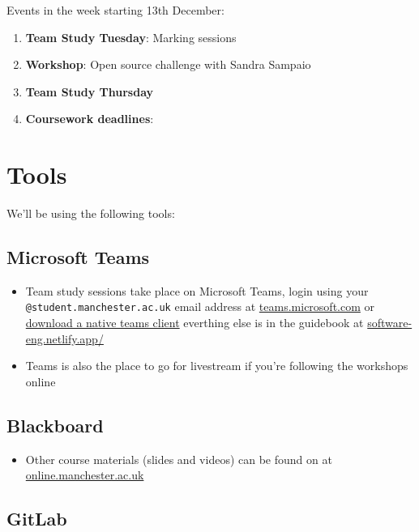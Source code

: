 \documentclass[
]{book}
\providecommand{\tightlist}{%
  \setlength{\itemsep}{0pt}\setlength{\parskip}{0pt}}
\begin{document}
Events in the week starting 13th December:

\begin{enumerate}
\def\labelenumi{\arabic{enumi}.}
\tightlist
\item
  \textbf{Team Study Tuesday}: Marking sessions
\item
  \textbf{Workshop}: Open source challenge with Sandra Sampaio
\item
  \textbf{Team Study Thursday}
\item
  \textbf{Coursework deadlines}:
\end{enumerate}

\hypertarget{tooling}{%
\section{Tools}\label{tooling}}

We'll be using the following tools:

\hypertarget{msfteams}{%
\subsection{Microsoft Teams}\label{msfteams}}

\begin{itemize}
\tightlist
\item
  Team study sessions take place on Microsoft Teams, login using your \texttt{@student.manchester.ac.uk} email address at \href{https://teams.microsoft.com/}{teams.microsoft.com} or \href{https://www.microsoft.com/en-gb/microsoft-teams/download-app}{download a native teams client} everthing else is in the guidebook at \href{https://software-eng.netlify.app/}{software-eng.netlify.app/}
\item
  Teams is also the place to go for livestream if you're following the workshops online
\end{itemize}

\hypertarget{blackboard}{%
\subsection{Blackboard}\label{blackboard}}

\begin{itemize}
\tightlist
\item
  Other course materials (slides and videos) can be found on at \href{https://online.manchester.ac.uk/}{online.manchester.ac.uk}
\end{itemize}

\hypertarget{gitlab}{%
\subsection{GitLab}\label{gitlab}}
\end{document}

